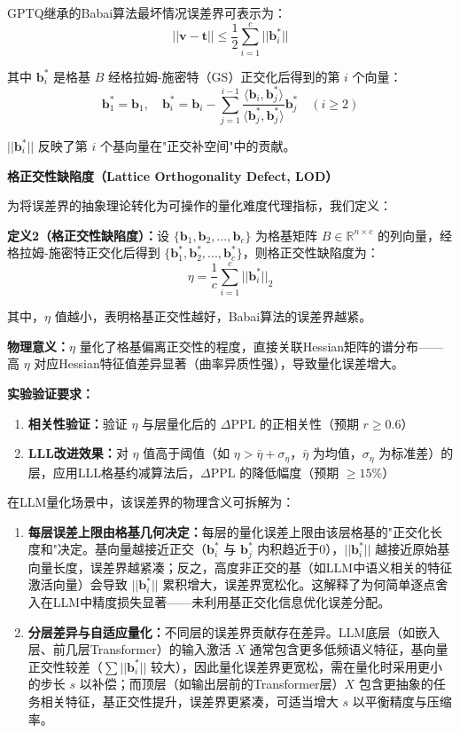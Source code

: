 \documentclass[letterpaper,twocolumn,10pt]{article}
\begin{document}
GPTQ继承的Babai算法最坏情况误差界可表示为：
$$||\mathbf{v} - \mathbf{t}|| \leq \frac{1}{2}\sum_{i=1}^c ||\mathbf{b}_i^*||$$

其中 $\mathbf{b}_i^*$ 是格基 $B$ 经格拉姆-施密特（GS）正交化后得到的第 $i$ 个向量：
$$\mathbf{b}_1^* = \mathbf{b}_1, \quad \mathbf{b}_i^* = \mathbf{b}_i - \sum_{j=1}^{i-1} \frac{\langle \mathbf{b}_i, \mathbf{b}_j^* \rangle}{\langle \mathbf{b}_j^*, \mathbf{b}_j^* \rangle} \mathbf{b}_j^* \quad (i \geq 2)$$

$||\mathbf{b}_i^*||$ 反映了第 $i$ 个基向量在"正交补空间"中的贡献。

\textbf{格正交性缺陷度（Lattice Orthogonality Defect, LOD）}

为将误差界的抽象理论转化为可操作的量化难度代理指标，我们定义：

\textbf{定义2（格正交性缺陷度）：}设 $\{\mathbf{b}_1, \mathbf{b}_2, ..., \mathbf{b}_c\}$ 为格基矩阵 $B \in \mathbb{R}^{n \times c}$ 的列向量，经格拉姆-施密特正交化后得到 $\{\mathbf{b}_1^*, \mathbf{b}_2^*, ..., \mathbf{b}_c^*\}$，则格正交性缺陷度为：
$$\eta = \frac{1}{c} \sum_{i=1}^c ||\mathbf{b}_i^*||_2$$

其中，$\eta$ 值越小，表明格基正交性越好，Babai算法的误差界越紧。

\textbf{物理意义：}$\eta$ 量化了格基偏离正交性的程度，直接关联Hessian矩阵的谱分布——高 $\eta$ 对应Hessian特征值差异显著（曲率异质性强），导致量化误差增大。

\textbf{实验验证要求：}

\begin{enumerate}
\item \textbf{相关性验证：}验证 $\eta$ 与层量化后的 $\Delta \text{PPL}$ 的正相关性（预期 $r \geq 0.6$）

\item \textbf{LLL改进效果：}对 $\eta$ 值高于阈值（如 $\eta > \bar{\eta} + \sigma_\eta$，$\bar{\eta}$ 为均值，$\sigma_\eta$ 为标准差）的层，应用LLL格基约减算法后，$\Delta \text{PPL}$ 的降低幅度（预期 $\geq 15\%$）
\end{enumerate}

在LLM量化场景中，该误差界的物理含义可拆解为：

\begin{enumerate}
\item \textbf{每层误差上限由格基几何决定：}每层的量化误差上限由该层格基的"正交化长度和"决定。基向量越接近正交（$\mathbf{b}_i^*$ 与 $\mathbf{b}_j^*$ 内积趋近于0），$||\mathbf{b}_i^*||$ 越接近原始基向量长度，误差界越紧凑；反之，高度非正交的基（如LLM中语义相关的特征激活向量）会导致 $||\mathbf{b}_i^*||$ 累积增大，误差界宽松化。这解释了为何简单逐点舍入在LLM中精度损失显著——未利用基正交化信息优化误差分配。

\item \textbf{分层差异与自适应量化：}不同层的误差界贡献存在差异。LLM底层（如嵌入层、前几层Transformer）的输入激活 $X$ 通常包含更多低频语义特征，基向量正交性较差（$\sum ||\mathbf{b}_i^*||$ 较大），因此量化误差界更宽松，需在量化时采用更小的步长 $s$ 以补偿；而顶层（如输出层前的Transformer层）$X$ 包含更抽象的任务相关特征，基正交性提升，误差界更紧凑，可适当增大 $s$ 以平衡精度与压缩率。
\end{enumerate}
\end{document}
